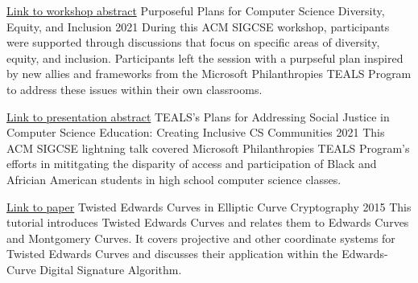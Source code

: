 \begin{cventries}
%
\cventry
     {\href{https://dl.acm.org/doi/10.1145/3408877.3439529}{Link to workshop abstract}}
    {Purposeful Plans for Computer Science Diversity, Equity, and Inclusion}
    {}
    {2021}
    {During this ACM SIGCSE workshop, participants were supported through discussions that focus on specific areas of diversity, equity, and inclusion. Participants left the session with a purpseful plan inspired by new allies and frameworks from the Microsoft Philanthropies TEALS Program to address these issues within their own classrooms.
    }

\cventry
     {\href{https://dl.acm.org/doi/10.1145/3408877.3439559}{Link to presentation abstract}}
    {TEALS's Plans for Addressing Social Justice in Computer Science Education: Creating Inclusive CS Communities}
    {}
    {2021}
    {This ACM SIGCSE lightning talk covered Microsoft Philanthropies TEALS Program's efforts in mititgating the disparity of access and participation of Black and Africian American students in high school computer science classes.
    }

\cventry
     {\href{https://www.semanticscholar.org/paper/Tutorial-of-Twisted-Edwards-Curves-in-Elliptic-Barnard/8eb88f622c8648aa40c2b60171da9d46c2414d5f}{Link to paper}}
    {Twisted Edwards Curves in Elliptic Curve Cryptography}
    {}
    {2015}
    {
         This tutorial introduces Twisted Edwards Curves and relates them to Edwards Curves and Montgomery Curves. It covers projective and other coordinate systems for Twisted Edwards Curves and discusses their application within the Edwards-Curve Digital Signature Algorithm.
    }


\end{cventries}
